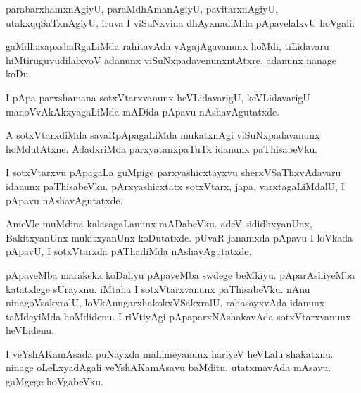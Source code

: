 \documentclass{article}
\begin{document}
\begin{mn}%
parabarxhamxnAgiyU, paraMdhAmanAgiyU, pavitarxnAgiyU, utakxqqSaTxnAgiyU, iruva I 
viSuNxvina dhAyxnadiMda pApavelalxvU hoVgali.
\end{mn}

\begin{mn}%
gaMdhasapxshaRgaLiMda rahitavAda yAgajAgavanunx hoMdi, tiLidavaru hiMtiruguvudilalxvoV 
adanunx viSuNxpadavenunxntAtxre. adanunx nanage koDu.
\end{mn}

\begin{mn}%
I pApa parxshamana sotxVtarxvanunx heVLidavarigU, keVLidavarigU manoVvAkAkxyagaLiMda 
mADida pApavu nAshavAgutatxde.
\end{mn}

\begin{mn}%
A sotxVtarxdiMda savaRpApagaLiMda mukatxnAgi viSuNxpadavanunx hoMdutAtxne. AdadxriMda 
parxyatanxpaTuTx idanunx paThisabeVku.
\end{mn}

\begin{mn}%
I sotxVtarxvu pApagaLa guMpige parxyashicxtayxvu sherxVSaThxvAdavaru idanunx paThisabeVku. 
pArxyashicxtatx sotxVtarx, japa, varxtagaLiMdalU, I pApavu nAshavAgutatxde.
\end{mn}

\begin{mn}%
AmeVle muMdina kalasagaLanunx mADabeVku. adeV sididhxyanUnx, BakitxyanUnx mukitxyanUnx 
koDutatxde. pUvaR janamxda pApavu I loVkada pApavU, I sotxVtarxda pAThadiMda 
nAshavAgutatxde.
\end{mn}

\begin{mn}%
pApaveMba marakekx koDaliyu pApaveMba swdege beMkiyu. pAparAshiyeMba katatxlege sUrayxnu. 
iMtaha I sotxVtarxvanunx paThisabeVku. nAnu ninagoVsakxralU, loVkAnugarxhakokxVSakxralU, 
rahasayxvAda idanunx taMdeyiMda hoMdidenu. I riVtiyAgi pApaparxNAshakavAda 
sotxVtarxvanunx heVLidenu.
\end{mn}

\begin{mn}%
I veYshAKamAsada puNayxda mahimeyanunx hariyeV heVLalu shakatxnu. ninage oLeLxyadAgali 
veYshAKamAsavu baMditu. utatxmavAda mAsavu. gaMgege hoVgabeVku.
\end{mn}


\end{document}
